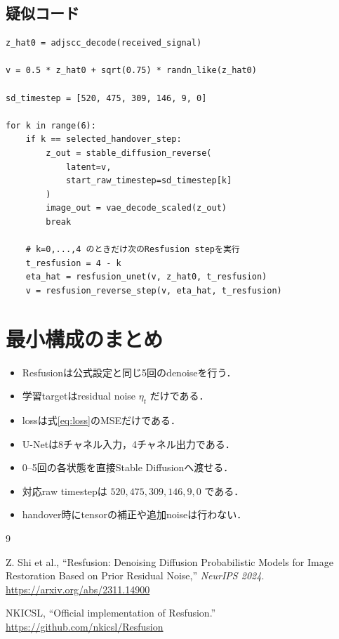 \documentclass[11pt,a4paper]{ltjsarticle}
\begin{document}
\subsection{疑似コード}

\begin{verbatim}
z_hat0 = adjscc_decode(received_signal)

v = 0.5 * z_hat0 + sqrt(0.75) * randn_like(z_hat0)

sd_timestep = [520, 475, 309, 146, 9, 0]

for k in range(6):
    if k == selected_handover_step:
        z_out = stable_diffusion_reverse(
            latent=v,
            start_raw_timestep=sd_timestep[k]
        )
        image_out = vae_decode_scaled(z_out)
        break

    # k=0,...,4 のときだけ次のResfusion stepを実行
    t_resfusion = 4 - k
    eta_hat = resfusion_unet(v, z_hat0, t_resfusion)
    v = resfusion_reverse_step(v, eta_hat, t_resfusion)
\end{verbatim}

\section{最小構成のまとめ}

\begin{itemize}
  \item Resfusionは公式設定と同じ5回のdenoiseを行う．
  \item 学習targetはresidual noise \(\eta_t\) だけである．
  \item lossは式\eqref{eq:loss}のMSEだけである．
  \item U-Netは8チャネル入力，4チャネル出力である．
  \item 0--5回の各状態を直接Stable Diffusionへ渡せる．
  \item 対応raw timestepは \(520,475,309,146,9,0\) である．
  \item handover時にtensorの補正や追加noiseは行わない．
\end{itemize}

\begin{thebibliography}{9}

Z. Shi et al.,
\newblock ``Resfusion: Denoising Diffusion Probabilistic Models for
Image Restoration Based on Prior Residual Noise,''
\newblock \emph{NeurIPS 2024}.
\newblock \url{https://arxiv.org/abs/2311.14900}

NKICSL,
\newblock ``Official implementation of Resfusion.''
\newblock \url{https://github.com/nkicsl/Resfusion}

\end{thebibliography}
\end{document}

